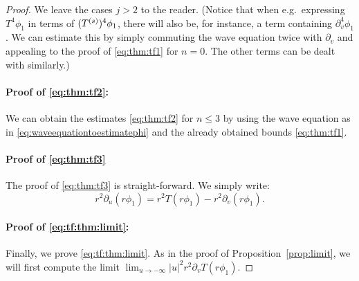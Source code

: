 \documentclass[11pt,english]{article}
\numberwithin{equation}{section}
\theoremstyle{remark}
\theoremstyle{plain}
\theoremstyle{remark}
\newcommand{\pu}{\partial_u}
\newcommand{\pv}{\partial_v}
\renewcommand{\(}{\left(}
\renewcommand{\)}{\right)}
\begin{document}
\begin{proof}
We leave the cases $j>2$ to the reader. 
(Notice that when e.g.\ expressing $T^4\phi_1$ in terms of $(T^{(s)})^4 \phi_1$, there will also be, for instance, a term containing $\pv^4\phi_1$. 
We can estimate this by simply commuting the wave equation twice with $\pv$ and appealing to the proof of \eqref{eq:thm:tf1} for $n=0$. 
The other terms can be dealt with similarly.)

\paragraph{Proof of \eqref{eq:thm:tf2}:}
We can obtain the estimates \eqref{eq:thm:tf2} for $n\leq 3$ by using the wave equation as in \eqref{eq:waveequationtoestimatephi} and the already obtained bounds \eqref{eq:thm:tf1}.

\paragraph{Proof of \eqref{eq:thm:tf3}}
The proof of \eqref{eq:thm:tf3} is straight-forward. We simply write:
\begin{equation}
r^2\pu(r\phi_1)=r^2T(r\phi_1)-r^2\pv(r\phi_1).
\end{equation}

\paragraph{Proof of \eqref{eq:tf:thm:limit}:}
Finally, we prove \eqref{eq:tf:thm:limit}. As in the proof of Proposition~\ref{prop:limit}, we will first compute the limit $\lim_{u\to-\infty}|u|^2r^2\pv T(r\phi_1)$. 


\end{proof}
\end{document}
